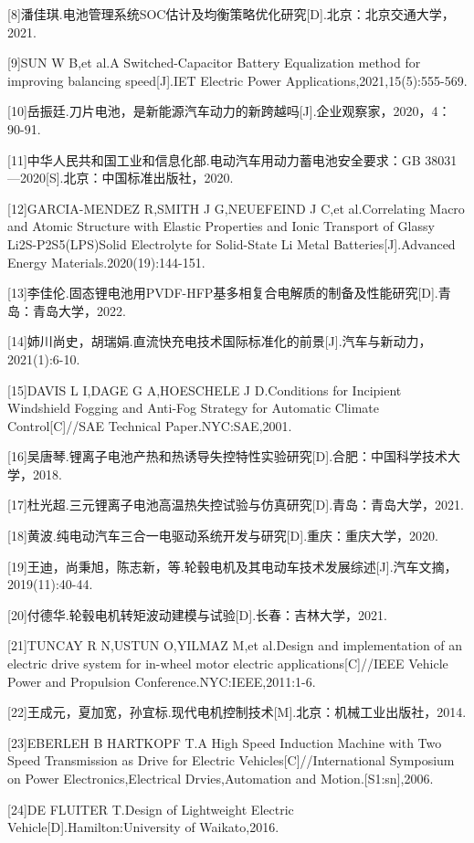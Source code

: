 \documentclass[12pt,UTF8]{ctexbook}
\begin{document}
[8]潘佳琪.电池管理系统SOC估计及均衡策略优化研究[D].北京：北京交通大学，2021.

[9]SUN W B,et al.A Switched-Capacitor Battery Equalization method for improving balancing speed[J].IET Electric Power Applications,2021,15(5):555-569.

[10]岳振廷.刀片电池，是新能源汽车动力的新跨越吗[J].企业观察家，2020，4：90-91.

[11]中华人民共和国工业和信息化部.电动汽车用动力蓄电池安全要求：GB 38031—2020[S].北京：中国标准出版社，2020.

[12]GARCIA-MENDEZ R,SMITH J G,NEUEFEIND J C,et al.Correlating Macro and Atomic Structure with Elastic Properties and Ionic Transport of Glassy Li2S-P2S5(LPS)Solid Electrolyte for Solid-State Li Metal Batteries[J].Advanced Energy Materials.2020(19):144-151.

[13]李佳伦.固态锂电池用PVDF-HFP基多相复合电解质的制备及性能研究[D].青岛：青岛大学，2022.

[14]姉川尚史，胡瑞娟.直流快充电技术国际标准化的前景[J].汽车与新动力，2021(1):6-10.

[15]DAVIS L I,DAGE G A,HOESCHELE J D.Conditions for Incipient Windshield Fogging and Anti-Fog Strategy for Automatic Climate Control[C]//SAE Technical Paper.NYC:SAE,2001.

[16]吴唐琴.锂离子电池产热和热诱导失控特性实验研究[D].合肥：中国科学技术大学，2018.

[17]杜光超.三元锂离子电池高温热失控试验与仿真研究[D].青岛：青岛大学，2021.

[18]黄波.纯电动汽车三合一电驱动系统开发与研究[D].重庆：重庆大学，2020.

[19]王迪，尚秉旭，陈志新，等.轮毂电机及其电动车技术发展综述[J].汽车文摘，2019(11):40-44.

[20]付德华.轮毂电机转矩波动建模与试验[D].长春：吉林大学，2021.

[21]TUNCAY R N,USTUN O,YILMAZ M,et al.Design and implementation of an electric drive system for in-wheel motor electric applications[C]//IEEE Vehicle Power and Propulsion Conference.NYC:IEEE,2011:1-6.

[22]王成元，夏加宽，孙宜标.现代电机控制技术[M].北京：机械工业出版社，2014.

[23]EBERLEH B HARTKOPF T.A High Speed Induction Machine with Two Speed Transmission as Drive for Electric Vehicles[C]//International Symposium on Power Electronics,Electrical Drvies,Automation and Motion.[S1:sn],2006.

[24]DE FLUITER T.Design of Lightweight Electric Vehicle[D].Hamilton:University of Waikato,2016.
\end{document}
